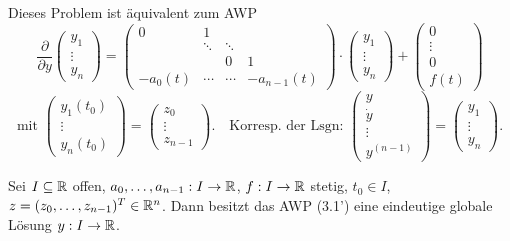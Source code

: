 \documentclass{cheat-sheet}
\begin{document}
\begin{bem}
  Dieses Problem ist äquivalent zum AWP
  \[
    \frac{\partial}{\partial y} \begin{pmatrix}
      y_1 \\ \vdots \\ y_n
    \end{pmatrix} = \begin{pmatrix}
      0 & 1 && \\
      & \ddots & \ddots & \\
      && 0 & 1\\
      - a_0(t) & \cdots & \cdots & -a_{n-1}(t)
    \end{pmatrix} \cdot \begin{pmatrix}
      y_1 \\ \vdots \\ y_n
    \end{pmatrix} + \begin{pmatrix}
      0 \\ \vdots \\ 0 \\ f(t)
    \end{pmatrix}
  \]
  \[
    \text{mit } \begin{pmatrix}
      y_1(t_0) \\ \vdots \\ y_n(t_0)
    \end{pmatrix} = \begin{pmatrix}
      z_0 \\ \vdots \\ z_{n-1}
    \end{pmatrix}.
    \quad \text{Korresp. der Lsgn: }
    \begin{pmatrix}
      y \\ \dot{y} \\ \vdots \\ y^{(n-1)}
    \end{pmatrix} = \begin{pmatrix}
      y_1 \\ \vdots \\ y_n
    \end{pmatrix}.
  \]
\end{bem}

\begin{satz}
  Sei $I \subseteq \mathbb{R}$ offen, $a_0, \ldots, a_{n-1} : I \to \mathbb{R}$, $f : I \to \mathbb{R}$ stetig, $t_0 \in I$, $z = (z_0, \ldots, z_{n-1})^T \in \mathbb{R}^n$. Dann besitzt das AWP (3.1') eine eindeutige globale Lösung $y : I \to \mathbb{R}$.
\end{satz}
\end{document}
